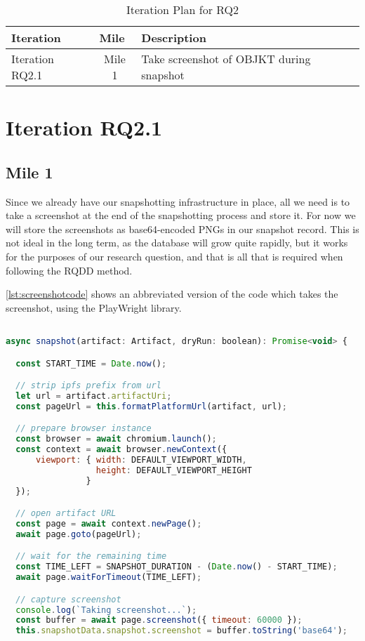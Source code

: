 \begin{table}[h]
\footnotesize
\centering
\begin{tabular}{|l|c|l|}
\hline
\textbf{Iteration}        & \multicolumn{1}{l|}{\textbf{Mile}} & \textbf{Description}                                         \\ \hline
Iteration RQ2.1                  & Mile 1                              & Take screenshot of OBJKT during snapshot               \\ \hline
\end{tabular}
\caption{Iteration Plan for RQ2}
\end{table}

\section {Iteration RQ2.1}


\subsection {Mile 1}

Since we already have our snapshotting infrastructure in place, all we need is to take a screenshot at the end of the snapshotting process and store it. For now we will store the screenshots as base64-encoded PNGs in our snapshot record. This is not ideal in the long term, as the database will grow quite rapidly, but it works for the purposes of our research question, and that is all that is required when following the RQDD method.

\autoref{lst:screenshotcode} shows an abbreviated version of the code which takes the screenshot, using the PlayWright library.

\vspace{0.5cm}

\begin{lstlisting}[language=JavaScript, caption={OBKJT screenshot code}, label={lst:screenshotcode}] 

async snapshot(artifact: Artifact, dryRun: boolean): Promise<void> {

  const START_TIME = Date.now();

  // strip ipfs prefix from url
  let url = artifact.artifactUri;
  const pageUrl = this.formatPlatformUrl(artifact, url);

  // prepare browser instance
  const browser = await chromium.launch();
  const context = await browser.newContext({
      viewport: { width: DEFAULT_VIEWPORT_WIDTH,
                  height: DEFAULT_VIEWPORT_HEIGHT
                }
  });

  // open artifact URL
  const page = await context.newPage();
  await page.goto(pageUrl);

  // wait for the remaining time
  const TIME_LEFT = SNAPSHOT_DURATION - (Date.now() - START_TIME);
  await page.waitForTimeout(TIME_LEFT);

  // capture screenshot
  console.log(`Taking screenshot...`);
  const buffer = await page.screenshot({ timeout: 60000 });
  this.snapshotData.snapshot.screenshot = buffer.toString('base64');
\end{lstlisting}


